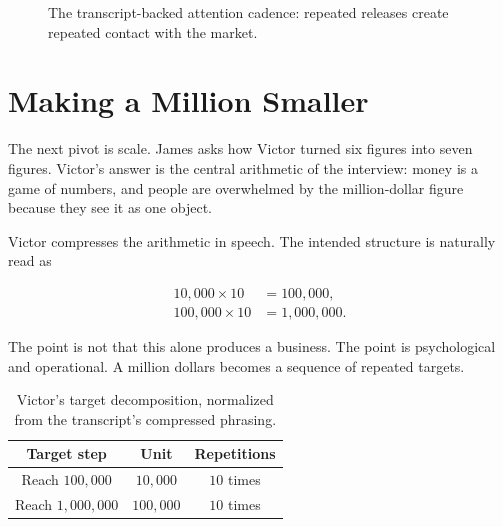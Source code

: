 \begin{figure}[h]
\centering
{}
\caption{The transcript-backed attention cadence: repeated releases create repeated contact with the market.}
\end{figure}

\section{Making a Million Smaller}

The next pivot is scale. James asks how Victor turned six figures into seven figures. Victor's answer is the central arithmetic of the interview: money is a game of numbers, and people are overwhelmed by the million-dollar figure because they see it as one object.

Victor compresses the arithmetic in speech. The intended structure is naturally read as

\begin{align}
10{,}000 \times 10 &= 100{,}000, \\
100{,}000 \times 10 &= 1{,}000{,}000.
\end{align}

The point is not that this alone produces a business. The point is psychological and operational. A million dollars becomes a sequence of repeated targets.

\begin{table}[h]
\centering
\begin{tabular}{c|c|c}
Target step & Unit & Repetitions \\
\hline
Reach \(100{,}000\) & \(10{,}000\) & \(10\) times \\
Reach \(1{,}000{,}000\) & \(100{,}000\) & \(10\) times \\
\end{tabular}
\caption{Victor's target decomposition, normalized from the transcript's compressed phrasing.}
\end{table}

